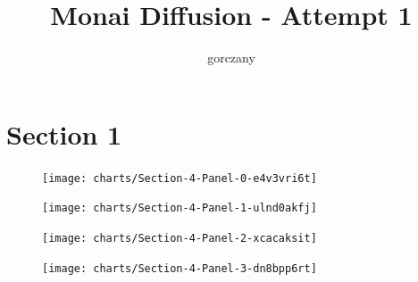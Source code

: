 \documentclass{article}
\title{Monai Diffusion - Attempt 1}
\author{%
gorczany
}
\begin{document}
\maketitle

\section{Section 1}

\begin{figure}[!htb]
\texttt{[image: charts/Section-4-Panel-0-e4v3vri6t]}
\caption{}
\endminipage\hfill
{}
\texttt{[image: charts/Section-4-Panel-1-ulnd0akfj]}
\caption{}
\endminipage
\end{figure}

\begin{figure}[!htb]
\texttt{[image: charts/Section-4-Panel-2-xcacaksit]}
\caption{}
\endminipage\hfill
{}
\texttt{[image: charts/Section-4-Panel-3-dn8bpp6rt]}
\caption{}
\endminipage
\end{figure}
\end{document}
